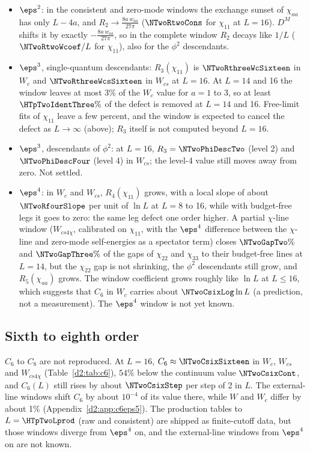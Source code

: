 \begin{itemize}
\item $\eps^2$: in the consistent and zero-mode windows the exchange sunset of $\chi_{aa}$ has only $L-4a$, and
 $R_2\to\frac{8a\,w_{aa}}{27\pi}$ ($\NTwoRtwoCons$ for $\chi_{11}$ at $L=16$). $D^M$ shifts it by exactly
 $-\frac{8a\,w_{aa}}{27\pi}$, so in the complete window $R_2$ decays like $1/L$ ($\NTwoRtwoWcoef/L$ for $\chi_{11}$), also for
 the $\phi^2$ descendants.
\item $\eps^3$, single-quantum descendants: $R_3(\chi_{11})$ is $\NTwoRthreeWcSixteen$ in $W_c$ and $\NTwoRthreeWcsSixteen$ in
 $W_{cs}$ at $L=16$. At $L=14$ and 16 the window leaves at most 3\% of the $W_c$ value for $a=1$ to 3, so at least
 $\HTpTwoIdentThree\%$ of the defect is removed at $L=14$ and 16. Free-limit fits of $\chi_{11}$ leave a few percent, and the window is
 expected to cancel the defect as $L\to\infty$ (above); $R_3$ itself is not computed beyond
 $L=16$.
\item $\eps^3$, descendants of $\phi^2$: at $L=16$, $R_3=\NTwoPhiDescTwo$ (level 2) and $\NTwoPhiDescFour$ (level 4) in $W_{cs}$;
 the level-4 value still moves away from zero. Not settled.
\item $\eps^4$: in $W_c$ and $W_{cs}$, $R_4(\chi_{11})$ grows, with a local slope of about $\NTwoRfourSlope$ per unit of $\ln L$
 at $L=8$ to 16, while with budget-free legs it goes
 to zero: the same leg defect one order higher. A partial $\chi$-line window ($W_{cs4\chi}$, calibrated on $\chi_{11}$, with the
 $\eps^4$ difference between the $\chi$-line and zero-mode self-energies as a spectator term) closes $\NTwoGapTwo\%$ and
 $\NTwoGapThree\%$ of the gaps of $\chi_{22}$ and $\chi_{33}$ to their budget-free lines at $L=14$, but the $\chi_{22}$ gap is not
 shrinking, the $\phi^2$ descendants still grow, and $R_5(\chi_{aa})$ grows. The window coefficient grows roughly like $\ln L$
 at $L\le16$, which suggests that
 $C_6$ in $W_c$ carries about $\NTwoCsixLog\ln L$ (a prediction, not a measurement). The $\eps^4$ window is not yet known.
\end{itemize}

\subsection{Sixth to eighth order}\label{d2:c6}
$C_6$ to $C_8$ are not reproduced. At $L=16$, $C_6\approx\NTwoCsixSixteen$ in $W_c$, $W_{cs}$ and $W_{cs4\chi}$
(Table~\ref{d2:tab:c6}), $54\%$ below the continuum value $\NTwoCsixCont$, and $C_6(L)$ still rises by about
$\NTwoCsixStep$ per step of 2 in $L$. The external-line windows shift $C_6$ by about $10^{-4}$ of its value there, while
$W$ and $W_c$ differ by about 1\% (Appendix~\ref{d2:app:c6eps5}). The production tables to $L=\HTpTwoLprod$ (raw and
consistent) are shipped as finite-cutoff data, but those windows diverge from $\eps^4$ on, and the external-line windows
from $\eps^4$ on are not known.

